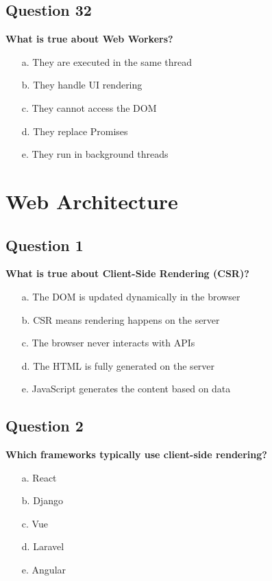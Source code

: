 \documentclass{article}
\begin{document}
\subsection*{Question 32}
\textbf{What is true about Web Workers?}

\begin{itemize}
  \item[a.] They are executed in the same thread
  \item[b.] They handle UI rendering
  \item[c.] They cannot access the DOM
  \item[d.] They replace Promises
  \item[e.] They run in background threads
\end{itemize}

\section{Web Architecture}

\subsection*{Question 1}
\textbf{What is true about Client-Side Rendering (CSR)?}

\begin{itemize}
  \item[a.] The DOM is updated dynamically in the browser
  \item[b.] CSR means rendering happens on the server
  \item[c.] The browser never interacts with APIs
  \item[d.] The HTML is fully generated on the server
  \item[e.] JavaScript generates the content based on data
\end{itemize}

\subsection*{Question 2}
\textbf{Which frameworks typically use client-side rendering?}

\begin{itemize}
  \item[a.] React
  \item[b.] Django
  \item[c.] Vue
  \item[d.] Laravel
  \item[e.] Angular
\end{itemize}
\end{document}
